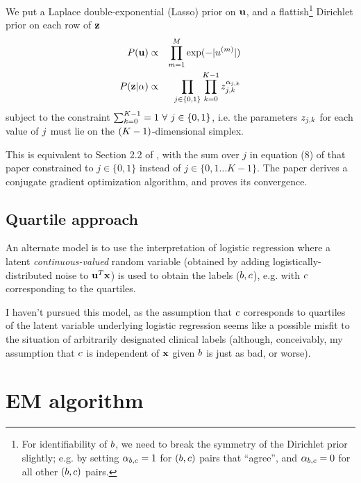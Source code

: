 \documentclass{article}
\begin{document}
We put a Laplace double-exponential (Lasso) prior on ${\bf u}$, and a flattish\footnote{
  For identifiability of $b$, we need to break the symmetry of the Dirichlet prior slightly;
  e.g. by setting $\alpha_{b,c} = 1$ for $(b,c)$ pairs that ``agree'',
  and $\alpha_{b,c} = 0$ for all other $(b,c)$ pairs.
} Dirichlet prior on each row of ${\bf z}$
\begin{eqnarray*}
P({\bf u}) & \propto & \prod_{m=1}^{M} \exp(-|u^{(m)}|) \\
P({\bf z}|\alpha) & \propto & \prod_{j \in \{0,1\}}
\prod_{k=0}^{K-1} z_{j,k}^{\alpha_{j,k}}
\end{eqnarray*}
subject to the constraint $\sum_{\catlabelindex=0}^{\catlabels-1} = 1\ \forall\ \binlabelindex \in \{0,1\}$,
i.e. the parameters $z_{j,k}$ for each value of $j$ must lie on the $(K-1)$-dimensional simplex.

This is equivalent to Section 2.2 of \cite{BootkrajangKaban2012},
with the sum over $j$ in equation (8) of that paper constrained to $j\in\{0,1\}$
instead of $j\in\{0,1\ldots K-1\}$.
The paper derives a conjugate gradient optimization algorithm,
and proves its convergence.

\subsection{Quartile approach}

An alternate model is to use the interpretation of logistic regression where a latent {\em continuous-valued} random variable
(obtained by adding logistically-distributed noise to ${\bf u}^T {\bf x}$)
is used to obtain the labels ($b,c$),
e.g. with $c$ corresponding to the quartiles.

I haven't pursued this model, as the assumption that $c$ corresponds to quartiles of the latent variable underlying
logistic regression seems like a possible misfit to the situation of arbitrarily designated clinical labels
(although, conceivably, my assumption that $c$ is independent of ${\bf x}$ given $b$ is just as bad, or worse).


\section{EM algorithm}
\end{document}
